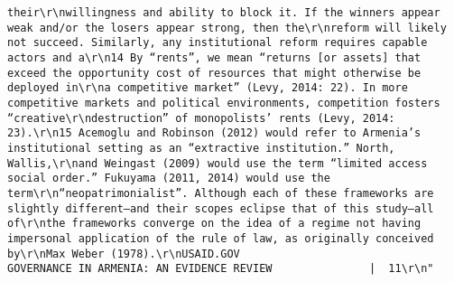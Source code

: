 \documentclass[
]{article}
\begin{document}
\begin{verbatim}
their\r\nwillingness and ability to block it. If the winners appear weak and/or the losers appear strong, then the\r\nreform will likely not succeed. Similarly, any institutional reform requires capable actors and a\r\n14 By “rents”, we mean “returns [or assets] that exceed the opportunity cost of resources that might otherwise be deployed in\r\na competitive market” (Levy, 2014: 22). In more competitive markets and political environments, competition fosters “creative\r\ndestruction” of monopolists’ rents (Levy, 2014: 23).\r\n15 Acemoglu and Robinson (2012) would refer to Armenia’s institutional setting as an “extractive institution.” North, Wallis,\r\nand Weingast (2009) would use the term “limited access social order.” Fukuyama (2011, 2014) would use the term\r\n“neopatrimonialist”. Although each of these frameworks are slightly different—and their scopes eclipse that of this study—all of\r\nthe frameworks converge on the idea of a regime not having impersonal application of the rule of law, as originally conceived by\r\nMax Weber (1978).\r\nUSAID.GOV                                                          GOVERNANCE IN ARMENIA: AN EVIDENCE REVIEW               |  11\r\n"                                                                                                                                                                                                                                                                                                                                                                                                                                                                                                                                                          

\end{verbatim}
\end{document}
